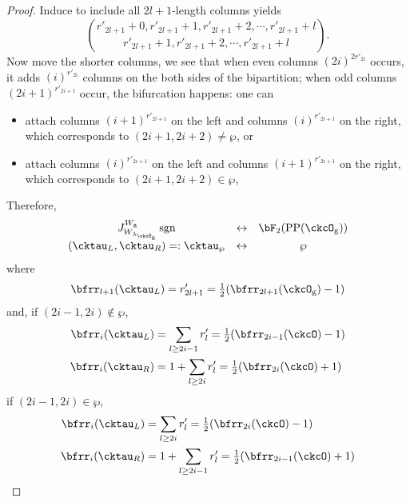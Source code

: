 \documentclass[12pt,a4paper]{amsart}
\newcommand{\sgn}{\operatorname{sgn}}
\numberwithin{equation}{section}
\theoremstyle{remark}
\def\half{{\tfrac{1}{2}}}
\def\lamckg{\lambda_{\ckcO_{\mathrm g}}}
\def\CPP{\mathrm{PP}}
\begin{document}
\begin{proof}
{{      Induce to include all $2l+1$-length columns yields
      \[
        \binom{r'_{2l+1}+0,r'_{2l+1}+1,r'_{2l+1}+2, \cdots, r'_{2l+1}+l}{ r'_{2l+1}+1,r'_{2l+1}+2, \cdots, r'_{2l+1}+l}.
      \]
      Now move the shorter columns, we see that when even columns
      $(2i)^{2r'_{2i}}$ occurs, it adds $(i)^{r'_{2i}}$ columns on the both
      sides of the bipartition; when odd columns $(2i+1)^{r'_{2i+1}}$ occur, the
      bifurcation happens: one can
      \begin{itemize}
        \item attach columns $(i+1)^{r'_{2i+1}}$ on the left and columns
              $(i)^{r'_{2i+1}}$ on the right, which corresponds to
              $(2i+1,2i+2)\neq \wp$, or
        \item attach columns $(i)^{r'_{2i+1}}$ on the left and columns
              $(i+1)^{r'_{2i+1}}$ on the right, which corresponds to
              $(2i+1,2i+2)\in \wp$,
      \end{itemize}

      Therefore,
      \[
        \begin{array}{ccc}
          J_{W_{\lamckg}}^{W_{\mathrm g}} \sgn
          &\leftrightarrow&  \bF_{2}(\CPP(\ckcO_{\mathrm g}))\\
          (\cktau_{L},\cktau_{R}) =:\cktau_{\wp}&\leftrightarrow & \wp
        \end{array}
      \]
      where
      \[
        \bfrr_{l+1}(\cktau_{L}) = r'_{2l+1} = \half (\bfrr_{2l+1}(\ckcO_{\mathrm g})-1)
      \]
      and, if $(2i-1,2i)\notin \wp$,
      \[
        \begin{split}
          \bfrr_{i}(\cktau_{L}) & = \sum_{l\geq 2i-1} r'_{l}
          = \half(\bfrr_{2i-1}(\ckcO)-1)\\
          \bfrr_{i}(\cktau_{R}) & = 1 + \sum_{l\geq 2i} r'_{l} = \half(\bfrr_{2i}(\ckcO)+1)
        \end{split}
      \]
      if $(2i-1,2i)\in \wp$,
      \[
        \begin{split}
          \bfrr_{i}(\cktau_{L}) & = \sum_{l\geq 2i} r'_{l}
          = \half(\bfrr_{2i}(\ckcO)-1)\\
          \bfrr_{i}(\cktau_{R}) & = 1 + \sum_{l\geq 2i-1} r'_{l} = \half(\bfrr_{2i-1}(\ckcO)+1)
        \end{split}
      \]


}}
\end{proof}
\end{document}
